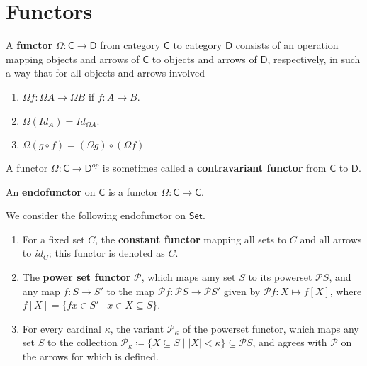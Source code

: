 \section{Functors}



\begin{df}[Functors]
	A \textbf{functor} $\Omega \colon \mathsf{C} \to \mathsf{D}$ from category $\mathsf{C}$ to category $\mathsf{D}$ consists of an operation mapping objects and arrows of $\mathsf{C}$ to objects and arrows of $\mathsf{D}$, 
	respectively, 
	in such a way that for all objects and arrows involved
	\begin{enumerate}[itemsep=5pt,parsep=5pt,leftmargin=4em,topsep=5pt,label=(\arabic*)]
		\item 
        $\Omega f \colon \Omega A \to \Omega B$ if $f \colon A \to B$.
		
		\item 
        $\Omega(Id_A) = Id_{\Omega A}$. 

		\item 
        $\Omega(g \circ f) = (\Omega g) \circ (\Omega f)$
	\end{enumerate}

	A functor $\Omega \colon \mathsf{C} \to \mathsf{D}^{op}$ is sometimes called a \textbf{contravariant functor} from $\mathsf{C}$ to $\mathsf{D}$.


	An \textbf{endofunctor} on $\mathsf{C}$ is a functor $\Omega \colon \mathsf{C} \to \mathsf{C}$.
\end{df}




\begin{example}
	We consider the following endofunctor on $\mathsf{Set}$. 
	\begin{enumerate}[itemsep=5pt,parsep=5pt,leftmargin=3em,topsep=5pt,label=(\arabic*)] %
		\item For a fixed set $C$, 
		the \textbf{constant functor} mapping all sets to $C$ and all arrows to $id_C$; 
		this functor is denoted as {\color{red} $C$}.


		\item The \textbf{power set functor} $\mathcal{P}$, 
		which maps amy set $S$ to its powerset $\mathcal{P} S$, 
		and any map $f \colon S \to S'$ to the map 
		$\mathcal{P} f \colon \mathcal{P} S \to \mathcal{P} S'$ given by $\mathcal{P} f \colon X \mapsto f[X]$, 
		where $f[X] = \{fx \in S' \mid x \in X \subseteq S\}$.


		\item For every cardinal $\kappa$, 
		the variant {\color{red} $\mathcal{P}_\kappa$} of the powerset functor, 
		which maps any set $S$ to the collection $\mathcal{P}_\kappa \coloneqq \{X \subseteq S \mid |X| < \kappa\} \subseteq \mathcal{P}S$, 
		and agrees with $\mathcal{P}$ on the arrows for which is defined.
	\end{enumerate}	
\end{example}





